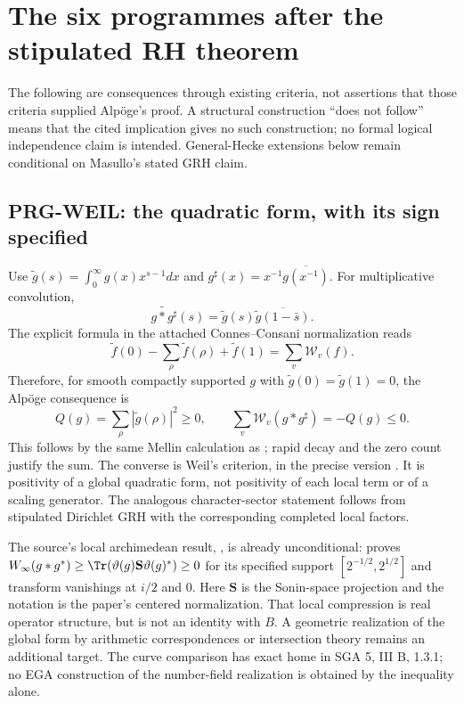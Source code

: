\section{The six programmes after the stipulated RH theorem}
The following are consequences through existing criteria, not assertions that those criteria supplied Alp\"oge's proof. A structural construction ``does not follow'' means that the cited implication gives no such construction; no formal logical independence claim is intended. General-Hecke extensions below remain conditional on Masullo's stated GRH claim.

\subsection{PRG-WEIL: the quadratic form, with its sign specified}
Use $\widetilde g(s)=\int_0^\infty g(x)x^{s-1}dx$ and $g^\sharp(x)=x^{-1}\overline{g(x^{-1})}$. For multiplicative convolution,
\[
 \widetilde{g*g^\sharp}(s)=\widetilde g(s)\overline{\widetilde g(1-\bar s)}.
\]
The explicit formula in the attached Connes--Consani normalization reads
\[
 \widetilde f(0)-\sum_\rho\widetilde f(\rho)+\widetilde f(1)=\sum_v\mathcal W_v(f).
\]
Therefore, for smooth compactly supported $g$ with $\widetilde g(0)=\widetilde g(1)=0$, the Alp\"oge consequence is
\[
 Q(g)=\sum_\rho|\widetilde g(\rho)|^2\ge0,
 \qquad \sum_v\mathcal W_v(g*g^\sharp)=-Q(g)\le0.
\]
This follows by the same Mellin calculation as ; rapid decay and the zero count justify the sum. The converse is Weil's criterion, in the precise version \cite[Appendix C, Proposition C.1, label \texttt{mainprop}]{cc}. It is positivity of a global quadratic form, not positivity of each local term or of a scaling generator. The analogous character-sector statement follows from stipulated Dirichlet GRH with the corresponding completed local factors.

The source's local archimedean result, , is already unconditional: \cite[Introduction, Theorem 1, label \texttt{mainthmintro}]{cc} proves
$W_\infty(g*g^*)\ge\Tr(\vartheta(g)\mathbf S\vartheta(g)^*)\ge0$
for its specified support $[2^{-1/2},2^{1/2}]$ and transform vanishings at $i/2$ and $0$. Here $\mathbf S$ is the Sonin-space projection and the notation is the paper's centered normalization. That local compression is real operator structure, but is not an identity with $B$. A geometric realization of the global form by arithmetic correspondences or intersection theory remains an additional target. The curve comparison has exact home in SGA 5, III B, 1.3.1; no EGA construction of the number-field realization is obtained by the inequality alone.

